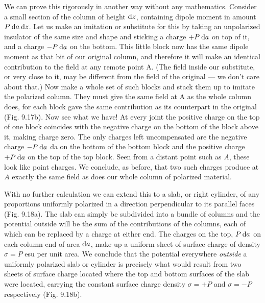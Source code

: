 We can prove this rigorously in another way without any 
mathematics. Consider a small section of the column of height $\textup{d} z$, containing
dipole moment in amount $P\:\textup{d} a\:\textup{d} z$. Let us make an 
imitation or substitute for this by taking an unpolarized insulator of the
same size and shape and sticking a charge $+P\: \textup{d} a$ on top of it, and a
charge $-P\: \textup{d} a$  on the bottom. This little block now has the same
dipole moment as that bit of our original column, and therefore it
will make an identical contribution to the field at any remote point A.
(The field inside our substitute, or very close to it, may be different
from the field of the original --- we don't care about that.) Now make
a whole set of such blocks and stack them up to imitate the polarized
column. They must give the same field at A as the whole column
does, for each block gave the same contribution as its counterpart
in the original (Fig. 9.17b). Now see what we have! At every joint
the positive charge on the top of one block coincides with the negative
charge on the bottom of the block above it, making charge zero.
The only charges left uncompensated are the negative charge $-P\: \textup{d} a$ da
on the bottom of the bottom block and the positive charge $+P\: \textup{d} a$ on
the top of the top block. Seen from a distant point such as $A$, these
look like point charges. We conclude, as before, that two such
charges produce at $A$ exactly the same field as does our whole column
of polarized material.

With no further calculation we can extend this to a slab, or right
cylinder, of any proportions uniformly polarized in a direction perpendicular
to its parallel faces (Fig. 9.18a). The slab can simply be
subdivided into a bundle of columns and the potential outside will
be the sum of the contributions of the columns, each of which can
be replaced by a charge at either end. The charges on the top, $P\:\textup{d} a$
on each column end of area $\textup{d} a$, make up a uniform sheet of surface
charge of density $\sigma=P$ esu per unit area. We conclude that the
potential everywhere \emph{outside} a uniformly polarized slab or cylinder
is precisely what would result from two sheets of surface charge
located where the top and bottom surfaces of the slab were located,
carrying the constant surface charge density $\sigma=+P$ and $\sigma=-P$
respectively (Fig. 9.18b).

